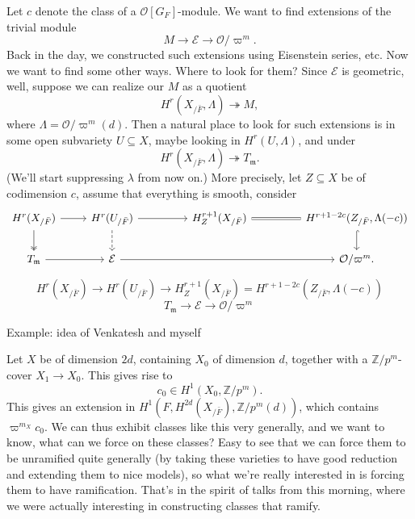 \documentclass[reqno]{amsart} 
\begin{document}
Let $c$ denote the class of a $\mathcal{O}[G_F]$-module.  We want to find extensions of the trivial module
\begin{equation*}
  M \rightarrow \mathcal{E} \rightarrow \mathcal{O} / \varpi^m.
\end{equation*}
Back in the day, we constructed such extensions using Eisenstein series, etc.  Now we want to find some other ways.  Where to look for them?  Since $\mathcal{E}$ is geometric, well, suppose we can realize our $M$ as a quotient
\begin{equation*}
  H^r(X_{/ \bar{F}}, \Lambda) \twoheadrightarrow M,
\end{equation*}
where $\Lambda = \mathcal{O} / \varpi^m(d)$.  Then a natural place to look for such extensions is in some open subvariety $U \subseteq X$, maybe looking in $H^r(U, \Lambda)$, and under
\begin{equation*}
  H^r(X_{/ \bar{F}}, \Lambda) \twoheadrightarrow T_{\mathfrak{m}}.
\end{equation*}
(We'll start suppressing $\lambda$ from now on.)  More precisely, let $Z \subseteq X$ be of codimension $c$, assume that everything is smooth, consider
\begin{equation*}
  \begin{tikzcd}
    H^r(X_{/ \bar{F}}) \arrow[r] \arrow[d, two heads] & 
    H^r(U_{/ \bar{F}}) \arrow[r] \arrow[d, dashed] & 
    H_Z^{r + 1}(X_{/\bar{F}}) \arrow[r, equal] &
    H^{r + 1 - 2 c}(Z_{/\bar{F}}, \Lambda(- c)) \arrow[d, hook] \\
    T_{\mathfrak{m}} \arrow[r] & 
    \mathcal{E} \arrow[rr] & 
    \phantom{H^{r + 1 - 2 c}(Z_{/\bar{F}}, \Lambda(- c))}
    &
    \mathcal{O} / \varpi^m.
  \end{tikzcd}
\end{equation*}
\begin{equation*}
  H^r(X_{/ \bar{F}})
  \rightarrow H^r(U_{/ \bar{F}})
  \rightarrow H_Z^{r + 1}(X_{/\bar{F}})
  = H^{r + 1 - 2 c}
  (Z_{/\bar{F}}, \Lambda(- c))
\end{equation*}
\begin{equation*}
  T_{\mathfrak{m}} \rightarrow \mathcal{E} \rightarrow \mathcal{O} / \varpi^m
\end{equation*}

Example: idea of Venkatesh and myself


Let $X$ be of dimension $2 d$, containing $X_0$ of dimension $d$, together with a $\mathbb{Z} / p^m$-cover $X_1 \rightarrow X_0$.  This gives rise to
\begin{equation*}
  c_0 \in H^1(X_0, \mathbb{Z} / p^m).
\end{equation*}
This gives an extension in $H^1(F, H^{2 d}(X_{/\bar{F}}), \mathbb{Z} / p^m(d))$, which contains $\varpi^{m_X} c_0$.  We can thus exhibit classes like this very generally, and we want to know, what can we force on these classes?  Easy to see that we can force them to be unramified quite generally (by taking these varieties to have good reduction and extending them to nice models), so what we're really interested in is forcing them to have ramification.  That's in the spirit of talks from this morning, where we were actually interesting in constructing classes that ramify.
\end{document}
